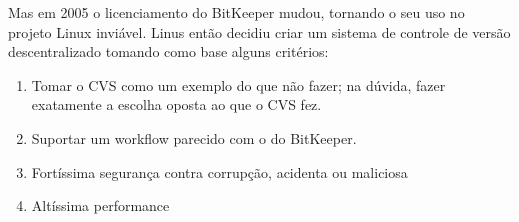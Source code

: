 Mas em 2005 o licenciamento do BitKeeper mudou, tornando o seu uso no
projeto Linux inviável. Linus então decidiu criar um sistema de controle
de versão descentralizado tomando como base alguns critérios:

\begin{enumerate}

\item Tomar o CVS como  um exemplo do que não fazer; na dúvida, fazer exatamente
a escolha oposta ao que o CVS fez.

\item Suportar um workflow parecido com o do BitKeeper.

\item Fortíssima segurança contra corrupção, acidenta ou maliciosa

\item Altíssima performance

\end{enumerate}


